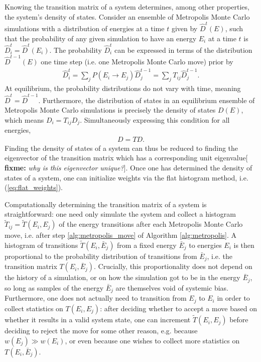 \documentclass[11pt]{article}
\newcommand{\p}[1]{\left(#1\right)} %
\newcommand{\red}[1]{{\bf \color{red} #1}}
\newcommand{\fixme}[1]{[\red{fixme:} \emph{#1}]}
\begin{document}
Knowing the transition matrix of a system determines, among other
properties, the system's density of states. Consider an ensemble of
Metropolis Monte Carlo simulations with a distribution of energies at
a time $t$ given by $\hat D^{t}\p{E}$, such that the probability of
any given simulation to have an energy $E_i$ at a time $t$ is $\hat
D_i^{t}=\hat D^{t}\p{E_i}$. The probability $\hat D_i^{t}$ can be
expressed in terms of the distribution $\hat D^{t-1}\p{E}$ one time
step (i.e. one Metropolis Monte Carlo move) prior by
\begin{align}
  \hat D_i^{t}=\sum_jP\p{E_i\to E_j}\hat D_j^{t-1} =\sum_j T_{ij}\hat
  D_j^{t-1}.
  \label{eq:transition_evolution}
\end{align}
At equilibrium, the probability distributions do not vary with time,
meaning $\hat D^{t}=\hat D^{t-1}$. Furthermore, the distribution of
states in an equilibrium ensemble of Metropolis Monte Carlo
simulations is precisely the density of states $D\p{E}$, which means
$D_i=T_{ij}D_j$.  Simultaneously expressing this condition for all
energies,
\begin{align}
  D=TD. \label{eq:dos_eigen}
\end{align}
Finding the density of states of a system can thus be reduced to
finding the eigenvector of the transition matrix which has a
corresponding unit eigenvalue\fixme{why is this eigenvector
  unique?}. Once one has determined the density of states of a system,
one can initialize weights via the flat histogram method,
i.e. (\ref{eq:flat_weights}).

Computationally determining the transition matrix of a system is
straightforward: one need only simulate the system and collect a
histogram $\tilde T_{ij}=\tilde T\p{E_i,E_j}$ of the energy
transitions after each Metropolis Monte Carlo move, i.e. after step
\ref{alg:metropolis_move} of Algorithm \ref{alg:metropolis}. A
histogram of transitions $\tilde T\p{E_i,\bar E_j}$ from a fixed
energy $\bar E_j$ to energies $E_i$ is then proportional to the
probability distribution of transitions from $\bar E_j$, i.e. the
transition matrix $T\p{E_i,\bar E_j}$. Crucially, this proportionality
does not depend on the history of a simulation, or on how the
simulation got to be in the energy $\bar E_j$, so long as samples of
the energy $\bar E_j$ are themselves void of systemic
bias. Furthermore, one does not actually need to transition from $E_j$
to $E_i$ in order to collect statistics on $T\p{E_i,E_j}$: after
deciding whether to accept a move based on whether it results in a
valid system state, one can increment $\tilde T\p{E_i,E_j}$ before
deciding to reject the move for some other reason, e.g. because
$w\p{E_j}\gg w\p{E_i}$, or even because one wishes to collect more
statistics on $T\p{E_i,\bar E_j}$.
\end{document}
